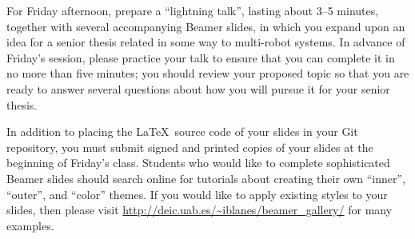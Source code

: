 For Friday afternoon, prepare a ``lightning talk'', lasting about 3--5 minutes, together with several accompanying
Beamer slides, in which you expand upon an idea for a senior thesis related in some way to multi-robot systems. In
advance of Friday's session, please practice your talk to ensure that you can complete it in no more than five minutes;
you should review your proposed topic so that you are ready to answer several questions about how you will pursue it for
your senior thesis.

In addition to placing the \LaTeX\ source code of your slides in your Git repository, you must submit signed and printed
copies of your slides at the beginning of Friday's class. Students who would like to complete sophisticated Beamer
slides should search online for tutorials about creating their own ``inner'', ``outer'', and ``color'' themes. If you
would like to apply existing styles to your slides, then please visit \url{http://deic.uab.es/~iblanes/beamer_gallery/}
for many examples.


